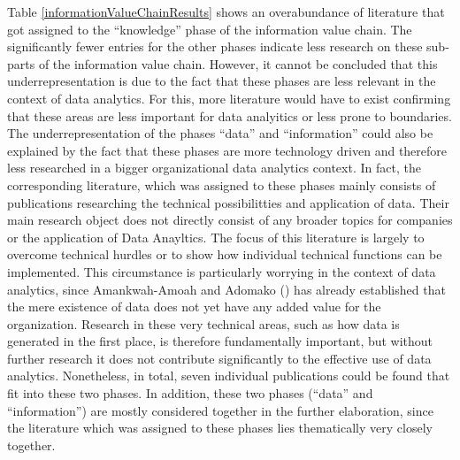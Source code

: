 Table \ref{informationValueChainResults} shows an overabundance of literature that got assigned to the \enquote{knowledge} phase of the information value chain. %
The significantly fewer entries for the other phases indicate less research on these sub-parts of the information value chain. However, it cannot be concluded that this underrepresentation is due to the fact that these phases are less relevant in the context of data analytics. For this, more literature would have to exist confirming that these areas are less important for data analyitics or less prone to boundaries. 
The underrepresentation of the phases \enquote{data} and \enquote{information} could also be explained by the fact that these phases are more technology driven and therefore less researched in a bigger organizational data analytics context. In fact, the corresponding literature, which was assigned to these phases mainly consists of publications researching the technical possibilitties and application of data. Their main research object does not directly consist of any broader topics for companies or the application of Data Anayltics. The focus of this literature is largely to overcome technical hurdles or to show how individual technical functions can be implemented.
This circumstance is particularly worrying in the context of data analytics, since Amankwah-Amoah and Adomako (\cite{AmankwahAmoah.2019}) has already established that the mere existence of data does not yet have any added value for the organization. Research in these very technical areas, such as how data is generated in the first place, is therefore fundamentally important, but without further research it does not contribute significantly to the effective use of data analytics.
Nonetheless, in total, seven individual publications could be found that fit into these two phases. In addition, these two phases (\enquote{data} and \enquote{information}) are mostly considered together in the further elaboration, since the literature which was assigned to these phases lies thematically very closely together. 

